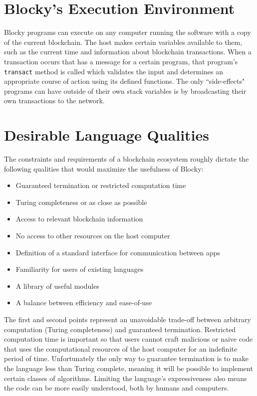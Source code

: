 \documentclass[letterpaper]{article}
\begin{document}
\section{Blocky's Execution Environment}

Blocky programs can execute on any computer running the software with a copy of the current blockchain. The host makes certain variables available to them, such as the current time and information about blockchain transactions. When a transaction occurs that has a message for a certain program, that program's \texttt{transact} method is called which validates the input and determines an appropriate course of action using its defined functions. The only ``side-effects" programs can have outside of their own stack variables is by broadcasting their own transactions to the network.

\section{Desirable Language Qualities}

The constraints and requirements of a blockchain ecosystem roughly dictate the following qualities that would maximize the usefulness of Blocky:
\begin{itemize}
  \item{Guaranteed termination or restricted computation time}
  \item{Turing completeness or as close as possible}
  \item{Access to relevant blockchain information}
  \item{No access to other resources on the host computer}
  \item{Definition of a standard interface for communication between apps}
  \item{Familiarity for users of existing languages}
  \item{A library of useful modules}
  \item{A balance between efficiency and ease-of-use}
\end{itemize}

The first and second points represent an unavoidable trade-off between arbitrary computation (Turing completeness) and guaranteed termination. Restricted computation time is important so that users cannot craft malicious or naive code that uses the computational resources of the host computer for an indefinite period of time. Unfortunately the only way to guarantee termination is to make the language less than Turing complete, meaning it will be possible to implement certain classes of algorithms\cite{turing37}. Limiting the language's expressiveness also means the code can be more easily understood, both by humans and computers\cite{plant15}.
\end{document}
